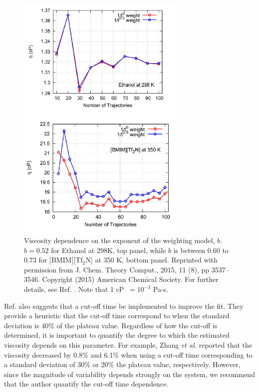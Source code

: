 \documentclass[9pt,bestpractices]{livecoms}
\begin{document}


\begin{figure}[htb!]
	\centering
	\includegraphics[width=3.2in]{ZhangFig7_12.png}
	\caption{Viscosity dependence on the exponent of the weighting model, $b$. $b = 0.52$ for Ethanol at 298K, top panel, while $b$ is between $0.60$ to $0.73$ for [BMIM][Tf$_2$N] at 350 K, bottom panel. Reprinted with permission from J. Chem. Theory Comput., 2015, 11 (8), pp 3537–3546. Copyright (2015) American Chemical Society. For further details, see Ref. \cite{Zhang2015}. Note that 1 cP $\ = 10^{-3}$ Pa-s.}
	\label{fig:ZhangFig7_12}
\end{figure}

Ref. \cite{Zhang2015} also suggests that a cut-off time be implemented to improve the fit. They provide a heuristic that the cut-off time correspond to when the standard deviation is 40\% of the plateau value. Regardless of how the cut-off is determined, it is important to quantify the degree to which the estimated viscosity depends on this parameter. For example, Zhang \textit{et al.} reported that the viscosity decreased by 0.8\% and 6.1\% when using a cut-off time corresponding to a standard deviation of 30\% or 20\% the plateau value, respectively. However, since the magnitude of variability depends strongly on the system, we recommend that the author quantify the cut-off time dependence.
\end{document}
